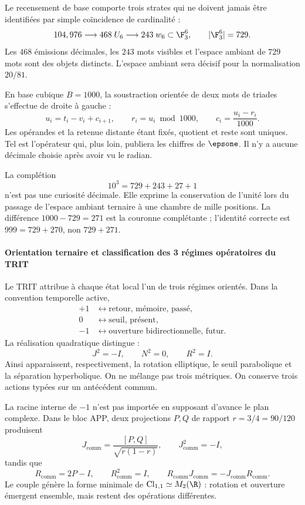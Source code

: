 Le recensement de base comporte trois strates qui ne doivent jamais être identifiées par simple
coïncidence de cardinalité :
\[
104,976\longrightarrow468\;U_6\longrightarrow243\;w_6
\subset\F_3^6,\qquad |\F_3^6|=729.
\]
Les \(468\) émissions décimales, les \(243\) mots visibles et l'espace ambiant
de \(729\) mots sont des objets distincts. L'espace ambiant sera décisif pour la
normalisation \(20/81\).

En base cubique \(B=1000\), la soustraction orientée de deux mots de triades
s'effectue de droite à gauche :
\begin{equation}
u_i=t_i-v_i+c_{i+1},\qquad
r_i=u_i\bmod1000,\qquad
c_i=\frac{u_i-r_i}{1000}.
\label{eq:subacarreo}
\end{equation}
Les opérandes et la retenue distante étant fixés, quotient et reste sont uniques. Tel est
l'opérateur qui, plus loin, publiera les chiffres de \(\epsone\). Il n'y a
aucune décimale choisie après avoir vu le radian.

La complétion
\[
10^3=729+243+27+1
\]
n'est pas une curiosité décimale. Elle exprime la conservation de l'unité lors du passage
de l'espace ambiant ternaire à une chambre de mille positions. La différence
\(1000-729=271\) est la couronne complétante ; l'identité correcte est
\(999=729+270\), non \(729+271\).

\paragraph{Orientation ternaire et classification des 3 régimes opératoires du TRIT}

Le TRIT attribue à chaque état local l'un de trois régimes orientés. Dans la
convention temporelle active,
\[
\begin{aligned}
+1&\longleftrightarrow\text{retour, mémoire, passé},\\
0&\longleftrightarrow\text{seuil, présent},\\
-1&\longleftrightarrow\text{ouverture bidirectionnelle, futur}.
\end{aligned}
\]
La réalisation quadratique distingue :
\begin{equation}
J^2=-I,\qquad N^2=0,\qquad R^2=I.
\label{eq:tres-regimenes}
\end{equation}
Ainsi apparaissent, respectivement, la rotation elliptique, le seuil parabolique et
la séparation hyperbolique. On ne mélange pas trois métriques. On conserve trois
actions typées sur un antécédent commun.

La racine interne de \(-1\) n'est pas importée en supposant d'avance le plan
complexe. Dans le bloc APP, deux projections \(P,Q\) de rapport
\(r=3/4=90/120\) produisent
\[
J_{\mathrm{comm}}=\frac{[P,Q]}{\sqrt{r(1-r)}},\qquad J_{\mathrm{comm}}^2=-I,
\]
tandis que
\[
R_{\mathrm{comm}}=2P-I,\qquad R_{\mathrm{comm}}^2=I,\qquad
R_{\mathrm{comm}}J_{\mathrm{comm}}=-J_{\mathrm{comm}}R_{\mathrm{comm}}.
\]
Le couple génère la forme minimale de \(\mathrm{Cl}_{1,1}\simeq M_2(\R)\) :
rotation et ouverture émergent ensemble, mais restent des opérations différentes.

